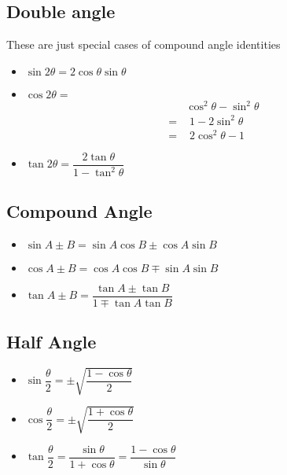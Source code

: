 \documentclass[11pt]{article}
\begin{document}
\subsection{Double angle}

These are just special cases of compound angle identities

\begin{itemize}
  \item $\sin 2\theta  = 2\cos\theta\sin\theta$
  \item $\cos 2\theta  = $\begin{align*}
           & \cos^2\theta - \sin^2\theta \\ = &\,\, 1 - 2\sin^2\theta \\ = & \,\, 2\cos^2\theta - 1
        \end{align*}
  \item $\tan 2\theta  = \dfrac{2\tan\theta}{1-\tan^2\theta}$
\end{itemize}

\pagebreak

\subsection{Compound Angle}

\begin{itemize}
  \item $\sin A \pm B  = \sin A \cos B \pm \cos A \sin B$
  \item $\cos A \pm B  = \cos A \cos B \mp \sin A \sin B$
  \item $\tan A \pm B = \dfrac{\tan A\pm \tan B}{1\mp\tan A \tan B}$
\end{itemize}

\subsection{Half Angle}

\begin{itemize}
  \item $\sin \dfrac{\theta}{2} = \pm\sqrt{\dfrac{1-\cos\theta}{2}}$
  \item $\cos \dfrac{\theta}{2} = \pm\sqrt{\dfrac{1+\cos\theta}{2}}$
  \item $\tan \dfrac{\theta}{2} = \dfrac{\sin\theta}{1 + \cos\theta} = \dfrac{1-\cos\theta}{\sin\theta}$
\end{itemize}
\end{document}
